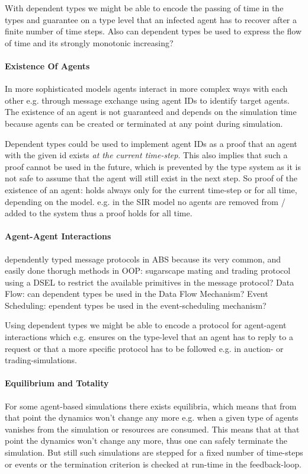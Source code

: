 With dependent types we might be able to encode the passing of time in the types and guarantee on a type level that an infected agent has to recover after a finite number of time steps. Also can dependent types be used to express the flow of time and its strongly monotonic increasing?
	
\paragraph{Existence Of Agents}
In more sophisticated models agents interact in more complex ways with each other e.g. through message exchange using agent IDs to identify target agents. The existence of an agent is not guaranteed and depends on the simulation time because agents can be created or terminated at any point during simulation. 

Dependent types could be used to implement agent IDs as a proof that an agent with the given id exists \textit{at the current time-step}. This also implies that such a proof cannot be used in the future, which is prevented by the type system as it is not safe to assume that the agent will still exist in the next step. So proof of the existence of an agent: holds always only for the current time-step or for all time, depending on the model. e.g. in the SIR model no agents are removed from / added to the system thus a proof holds for all time. 

\paragraph{Agent-Agent Interactions}
dependently typed message protocols in ABS because its very common, and easily done thorugh methods in OOP: sugarscape mating and trading protocol
using a DSEL \cite{brady_correct-by-construction_2010} to restrict the available primitives in the message protocol?
Data Flow: can dependent types be used in the Data Flow Mechanism?
Event Scheduling: ependent types be used in the event-scheduling mechanism?

Using dependent types we might be able to encode a protocol for agent-agent interactions which e.g. ensures on the type-level that an agent has to reply to a request or that a more specific protocol has to be followed e.g. in auction- or trading-simulations.

\paragraph{Equilibrium and Totality}
For some agent-based simulations there exists equilibria, which means that from that point the dynamics won't change any more e.g. when a given type of agents vanishes from the simulation or resources are consumed. This means that at that point the dynamics won't change any more, thus one can safely terminate the simulation. But still such simulations are stepped for a fixed number of time-steps or events or the termination criterion is checked at run-time in the feedback-loop. 
	
